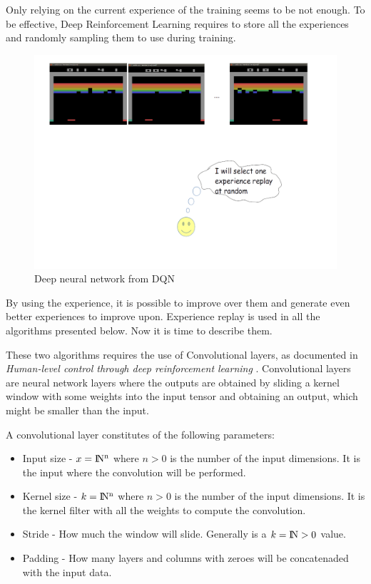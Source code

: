 \documentclass[11pt,twoside,a4paper]{article}
\begin{document}
Only relying on the current experience of the training seems to be not enough.
To be effective, Deep Reinforcement Learning requires to store all the
experiences and randomly sampling them to use during training.

\begin{figure}[h!]
  \includegraphics[width=\linewidth]{images/ExperienceReplay.png}
  \caption{Deep neural network from DQN}
  \label{fig:experience-replay}
\end{figure}

By using the experience, it is possible to improve over them and generate even
better experiences to improve upon. Experience replay is used in all the
algorithms presented below. Now it is time to describe them.

These two algorithms requires the use of Convolutional layers, as
documented in \emph{Human-level control through deep reinforcement learning}
\cite{mnih2015humanlevel}. Convolutional layers are neural network layers where
the outputs are obtained by sliding a kernel window with some weights into the
input tensor and obtaining an output, which might be smaller than the input.

A convolutional layer constitutes of the following parameters:

\begin{itemize}
  \item Input size - $ x = \rm I\!N^n $ where $ n > 0 $ is the number of the input dimensions.
  It is the input where the convolution will be performed.
  \item Kernel size - $ k = \rm I\!N^n $ where $ n > 0 $ is the number of the input dimensions.
  It is the kernel filter with all the weights to compute the convolution.
  \item Stride - How much the window will slide. Generally is a $ k = \rm I\!N > 0 $ value.
  \item Padding - How many layers and columns with zeroes will be concatenaded with the input data.
\end{itemize}
\end{document}
